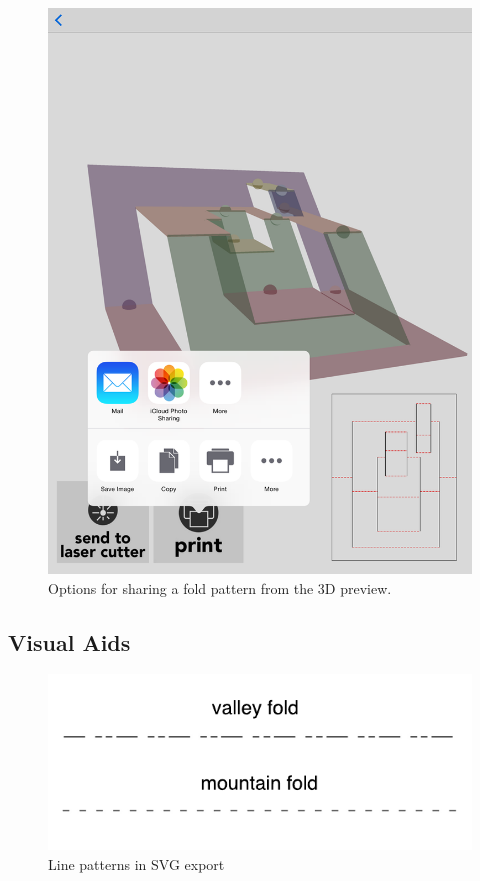 \begin{figure}[htbp]
\centering
\includegraphics{figures/32_UI_Tool_Interactions/3d-share.png}
\caption{Options for sharing a fold pattern from the 3D preview.}
\end{figure}

\subsection{Visual Aids}\label{visual-aids}

\begin{figure}[htbp]
\centering
\includegraphics{figures/32_UI_Tool_Interactions/dot-dash.pdf}
\caption{Line patterns in SVG export}
\end{figure}


